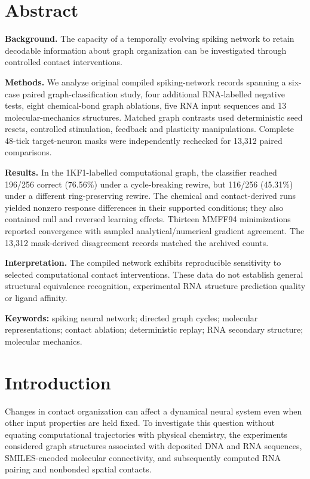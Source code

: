 \documentclass[10pt,a4paper]{article}
\begin{document}
\section*{Abstract}
\textbf{Background.} The capacity of a temporally evolving spiking network to retain decodable information about graph organization can be investigated through controlled contact interventions.\par
\textbf{Methods.} We analyze original compiled spiking-network records spanning a six-case paired graph-classification study, four additional RNA-labelled negative tests, eight chemical-bond graph ablations, five RNA input sequences and 13 molecular-mechanics structures. Matched graph contrasts used deterministic seed resets, controlled stimulation, feedback and plasticity manipulations. Complete 48-tick target-neuron masks were independently rechecked for 13,312 paired comparisons.\par
\textbf{Results.} In the 1KF1-labelled computational graph, the classifier reached 196/256 correct (76.56\%) under a cycle-breaking rewire, but 116/256 (45.31\%) under a different ring-preserving rewire. The chemical and contact-derived runs yielded nonzero response differences in their supported conditions; they also contained null and reversed learning effects. Thirteen MMFF94 minimizations reported convergence with sampled analytical/numerical gradient agreement. The 13,312 mask-derived disagreement records matched the archived counts.\par
\textbf{Interpretation.} The compiled network exhibits reproducible sensitivity to selected computational contact interventions. These data do not establish general structural equivalence recognition, experimental RNA structure prediction quality or ligand affinity.\par
\textbf{Keywords:} spiking neural network; directed graph cycles; molecular representations; contact ablation; deterministic replay; RNA secondary structure; molecular mechanics.

\section{Introduction}
Changes in contact organization can affect a dynamical neural system even when other input properties are held fixed. To investigate this question without equating computational trajectories with physical chemistry, the experiments considered graph structures associated with deposited DNA and RNA sequences, SMILES-encoded molecular connectivity, and subsequently computed RNA pairing and nonbonded spatial contacts.
\end{document}
